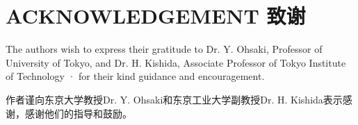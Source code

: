 \section*{ACKNOWLEDGEMENT 致谢}

\begin{paracol}{2}
    
    The authors wish to express their gratitude to Dr. Y. Ohsaki, Professor of University of Tokyo, and Dr. H. Kishida, Associate Professor of Tokyo Institute of Technology · for their kind guidance and encouragement.

    \switchcolumn

    作者谨向东京大学教授Dr. Y. Ohsaki和东京工业大学副教授Dr. H. Kishida表示感谢，感谢他们的指导和鼓励。

\end{paracol}